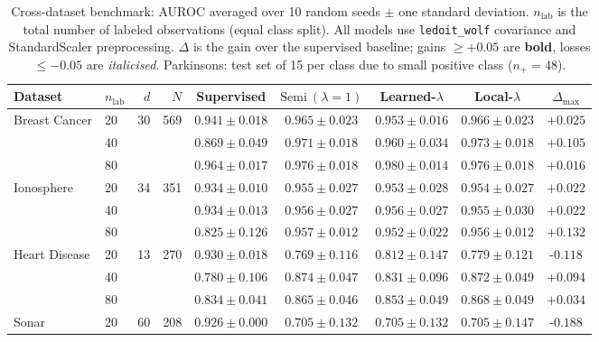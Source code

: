 \documentclass[11pt]{article}
\theoremstyle{definition}
\begin{document}
\begin{table}[t]
\centering
\caption{
  Cross-dataset benchmark: AUROC averaged over 10 random seeds $\pm$ one standard deviation.
  $n_{\text{lab}}$ is the total number of labeled observations (equal class split).
  All models use \texttt{ledoit\_wolf} covariance and StandardScaler preprocessing.
  $\Delta$ is the gain over the supervised baseline; gains $\geq +0.05$ are \textbf{bold},
  losses $\leq -0.05$ are \textit{italicised}.
  Parkinsons: test set of 15 per class due to small positive class ($n_{+}=48$).
}
\label{tab:uci-benchmark}
\setlength{\tabcolsep}{4pt}
\begin{tabular}{llrr cccc c}
\hline
Dataset & $n_{\text{lab}}$ & $d$ & $N$ &
  Supervised &
  $\text{Semi}~(\lambda{=}1)$ &
  Learned-$\lambda$ &
  Local-$\lambda$ &
  $\Delta_{\max}$ \\
\hline
\multirow{3}{*}{Breast Cancer}
  & 20 & \multirow{3}{*}{30} & \multirow{3}{*}{569}
      & $0.941\pm0.018$ & $0.965\pm0.023$ & $0.953\pm0.016$ & $0.966\pm0.023$ & $\mathbf{+0.025}$ \\
  & 40 & & & $0.869\pm0.049$ & $0.971\pm0.018$ & $0.960\pm0.034$ & $0.973\pm0.018$ & $\mathbf{+0.105}$ \\
  & 80 & & & $0.964\pm0.017$ & $0.976\pm0.018$ & $0.980\pm0.014$ & $0.976\pm0.018$ & $+0.016$ \\
\hline
\multirow{3}{*}{Ionosphere}
  & 20 & \multirow{3}{*}{34} & \multirow{3}{*}{351}
      & $0.934\pm0.010$ & $0.955\pm0.027$ & $0.953\pm0.028$ & $0.954\pm0.027$ & $+0.022$ \\
  & 40 & & & $0.934\pm0.013$ & $0.956\pm0.027$ & $0.956\pm0.027$ & $0.955\pm0.030$ & $+0.022$ \\
  & 80 & & & $0.825\pm0.126$ & $0.957\pm0.012$ & $0.952\pm0.022$ & $0.956\pm0.012$ & $\mathbf{+0.132}$ \\
\hline
\multirow{3}{*}{Heart Disease}
  & 20 & \multirow{3}{*}{13} & \multirow{3}{*}{270}
      & $0.930\pm0.018$ & $0.769\pm0.116$ & $0.812\pm0.147$ & $0.779\pm0.121$ & $\textit{-0.118}$ \\
  & 40 & & & $0.780\pm0.106$ & $0.874\pm0.047$ & $0.831\pm0.096$ & $0.872\pm0.049$ & $\mathbf{+0.094}$ \\
  & 80 & & & $0.834\pm0.041$ & $0.865\pm0.046$ & $0.853\pm0.049$ & $0.868\pm0.049$ & $+0.034$ \\
\hline
\multirow{3}{*}{Sonar}
  & 20 & \multirow{3}{*}{60} & \multirow{3}{*}{208}
      & $0.926\pm0.000$ & $0.705\pm0.132$ & $0.705\pm0.132$ & $0.705\pm0.147$ & $\textit{-0.188}$ \\

\end{tabular}
\end{table}
\end{document}
